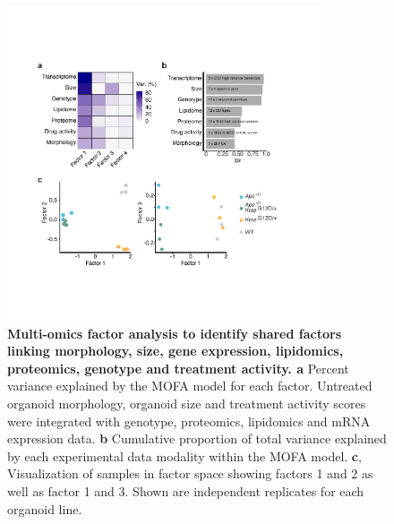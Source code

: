 \begin{flushleft}
\begin{figure}[h!]
\centering
\includegraphics[width=350,
                height=\textheight,
                keepaspectratio]{figures/adenomaprofiling/pdf/fig_1_7.pdf}
\caption{\textbf{Multi-omics factor analysis to identify shared factors linking morphology, size, gene expression, lipidomics, proteomics, genotype and treatment activity. a} Percent variance explained by the MOFA model for each factor. Untreated organoid morphology, organoid size and treatment activity scores were integrated with genotype, proteomics, lipidomics and mRNA expression data. \textbf{b} Cumulative proportion of total variance explained by each experimental data modality within the MOFA model. \textbf{c}, Visualization of samples in factor space showing factors 1 and 2 as well as factor 1 and 3. Shown are independent replicates for each organoid line. 
}
\label{fig_170}
\end{figure}
\bigbreak


\end{flushleft}
